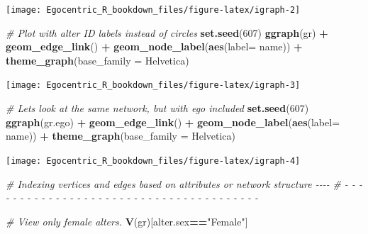 \documentclass[
]{book}
\newenvironment{Shaded}{\begin{snugshade}}{\end{snugshade}}
\newcommand{\AttributeTok}[1]{\textcolor[rgb]{0.13,0.29,0.53}{#1}}
\newcommand{\CommentTok}[1]{\textcolor[rgb]{0.56,0.35,0.01}{\textit{#1}}}
\newcommand{\DecValTok}[1]{\textcolor[rgb]{0.00,0.00,0.81}{#1}}
\newcommand{\FunctionTok}[1]{\textcolor[rgb]{0.13,0.29,0.53}{\textbf{#1}}}
\newcommand{\NormalTok}[1]{#1}
\newcommand{\SpecialCharTok}[1]{\textcolor[rgb]{0.81,0.36,0.00}{\textbf{#1}}}
\newcommand{\StringTok}[1]{\textcolor[rgb]{0.31,0.60,0.02}{#1}}
\begin{document}
\begin{center}\texttt{[image: Egocentric\_R\_bookdown\_files/figure-latex/igraph-2]} \end{center}

\begin{Shaded}
\begin{Highlighting}[]
\CommentTok{\# Plot with alter ID labels instead of circles}
\FunctionTok{set.seed}\NormalTok{(}\DecValTok{607}\NormalTok{)}
\FunctionTok{ggraph}\NormalTok{(gr) }\SpecialCharTok{+} 
  \FunctionTok{geom\_edge\_link}\NormalTok{() }\SpecialCharTok{+}
  \FunctionTok{geom\_node\_label}\NormalTok{(}\FunctionTok{aes}\NormalTok{(}\AttributeTok{label=}\NormalTok{ name)) }\SpecialCharTok{+} 
  \FunctionTok{theme\_graph}\NormalTok{(}\AttributeTok{base\_family =} \StringTok{\textquotesingle{}Helvetica\textquotesingle{}}\NormalTok{)}
\end{Highlighting}
\end{Shaded}

\begin{center}\texttt{[image: Egocentric\_R\_bookdown\_files/figure-latex/igraph-3]} \end{center}

\begin{Shaded}
\begin{Highlighting}[]
\CommentTok{\# Let\textquotesingle{}s look at the same network, but with ego included}
\FunctionTok{set.seed}\NormalTok{(}\DecValTok{607}\NormalTok{)}
\FunctionTok{ggraph}\NormalTok{(gr.ego) }\SpecialCharTok{+} 
  \FunctionTok{geom\_edge\_link}\NormalTok{() }\SpecialCharTok{+}
  \FunctionTok{geom\_node\_label}\NormalTok{(}\FunctionTok{aes}\NormalTok{(}\AttributeTok{label=}\NormalTok{ name)) }\SpecialCharTok{+} 
  \FunctionTok{theme\_graph}\NormalTok{(}\AttributeTok{base\_family =} \StringTok{\textquotesingle{}Helvetica\textquotesingle{}}\NormalTok{)}
\end{Highlighting}
\end{Shaded}

\begin{center}\texttt{[image: Egocentric\_R\_bookdown\_files/figure-latex/igraph-4]} \end{center}

\begin{Shaded}
\begin{Highlighting}[]
\CommentTok{\# Indexing vertices and edges based on attributes or network structure      {-}{-}{-}{-}}
\CommentTok{\# {-} {-} {-} {-} {-} {-} {-} {-} {-} {-} {-} {-} {-} {-} {-} {-} {-} {-} {-} {-} {-} {-} {-} {-} {-} {-} {-} {-} {-} {-} {-} {-} {-} {-} {-} {-} {-} {-} {-} }

\CommentTok{\# View only female alters.}
\FunctionTok{V}\NormalTok{(gr)[alter.sex}\SpecialCharTok{==}\StringTok{"Female"}\NormalTok{]}
\end{Highlighting}
\end{Shaded}
\end{document}
